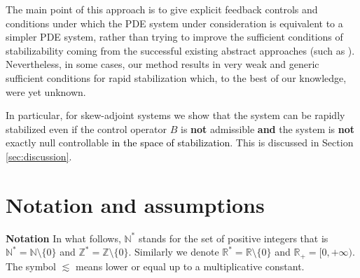 \documentclass[11pt, dvipsnames]{amsart}
\begin{document}
The main point of this approach is to give explicit feedback controls and conditions under which the PDE system under consideration is equivalent to a simpler PDE system, rather than trying to improve the sufficient conditions of stabilizability coming from the successful existing abstract approaches (such as \cite{LT1,LT2,trelat2019characterization,vest2013rapid,ma2023feedback,liu2022characterizations,nguyen2024stabilization}). Nevertheless, in some cases, our method results in very weak and generic sufficient conditions for rapid stabilization 
which, to the best of our knowledge, were yet unknown.

In particular, for skew-adjoint systems we show that the system can be rapidly stabilized even if the control operator $B$ is \textbf{not} admissible \textbf{and} the system is \textbf{not} exactly null controllable \textcolor{black}{in the space of stabilization}. This is discussed in Section \ref{sec:discussion}.

\section{Notation and assumptions}
\label{sec:notations}
{\color{black}
\noindent \textbf{Notation}\;\;
In what follows, 
$\mathbb{N}^{*}$ stands for the set of positive integers
that is
$\mathbb{N}^*=\mathbb{N}\setminus\{0\}$ and $\mathbb{Z}^*=\mathbb{Z}\setminus\{0\}.$ 
Similarly we denote $\mathbb{R}^*=\mathbb{R}\setminus\{0\}$ and $\mathbb{R}_+=[0, +\infty)$. 
The symbol $\lesssim$ means lower or equal up to a multiplicative constant.}\\
\end{document}
